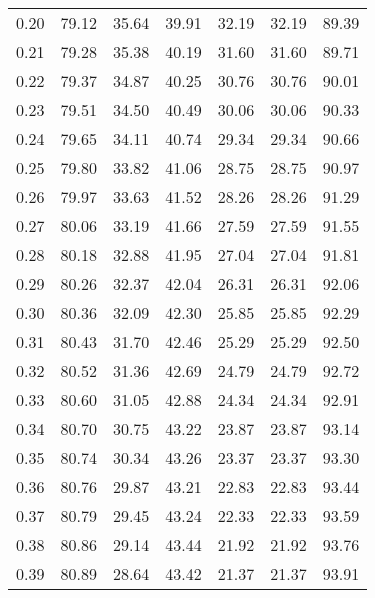 \begin{tabular}{|c|c|c|c|c|c|c|}
      0.20 &     79.12 &     35.64 &      39.91 &   32.19 &      32.19 &         89.39 \\
      0.21 &     79.28 &     35.38 &      40.19 &   31.60 &      31.60 &         89.71 \\
      0.22 &     79.37 &     34.87 &      40.25 &   30.76 &      30.76 &         90.01 \\
      0.23 &     79.51 &     34.50 &      40.49 &   30.06 &      30.06 &         90.33 \\
      0.24 &     79.65 &     34.11 &      40.74 &   29.34 &      29.34 &         90.66 \\
      0.25 &     79.80 &     33.82 &      41.06 &   28.75 &      28.75 &         90.97 \\
      0.26 &     79.97 &     33.63 &      41.52 &   28.26 &      28.26 &         91.29 \\
      0.27 &     80.06 &     33.19 &      41.66 &   27.59 &      27.59 &         91.55 \\
      0.28 &     80.18 &     32.88 &      41.95 &   27.04 &      27.04 &         91.81 \\
      0.29 &     80.26 &     32.37 &      42.04 &   26.31 &      26.31 &         92.06 \\
      0.30 &     80.36 &     32.09 &      42.30 &   25.85 &      25.85 &         92.29 \\
      0.31 &     80.43 &     31.70 &      42.46 &   25.29 &      25.29 &         92.50 \\
      0.32 &     80.52 &     31.36 &      42.69 &   24.79 &      24.79 &         92.72 \\
      0.33 &     80.60 &     31.05 &      42.88 &   24.34 &      24.34 &         92.91 \\
      0.34 &     80.70 &     30.75 &      43.22 &   23.87 &      23.87 &         93.14 \\
      0.35 &     80.74 &     30.34 &      43.26 &   23.37 &      23.37 &         93.30 \\
      0.36 &     80.76 &     29.87 &      43.21 &   22.83 &      22.83 &         93.44 \\
      0.37 &     80.79 &     29.45 &      43.24 &   22.33 &      22.33 &         93.59 \\
      0.38 &     80.86 &     29.14 &      43.44 &   21.92 &      21.92 &         93.76 \\
      0.39 &     80.89 &     28.64 &      43.42 &   21.37 &      21.37 &         93.91 \\

\end{tabular}
